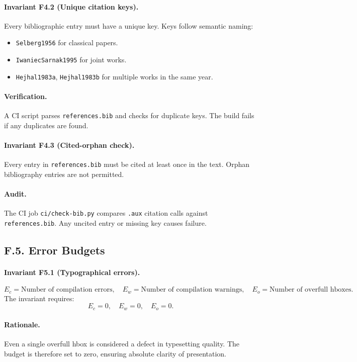 \paragraph{Invariant F4.2 (Unique citation keys).} Every bibliographic entry must have a unique key. Keys follow semantic naming:
\begin{itemize}
    \item \texttt{Selberg1956} for classical papers.
    \item \texttt{IwaniecSarnak1995} for joint works.
    \item \texttt{Hejhal1983a}, \texttt{Hejhal1983b} for multiple works in the same year.
\end{itemize}

\paragraph{Verification.} A CI script parses \texttt{references.bib} and checks for duplicate keys. The build fails if any duplicates are found.

\paragraph{Invariant F4.3 (Cited-orphan check).} Every entry in \texttt{references.bib} must be cited at least once in the text. Orphan bibliography entries are not permitted.

\paragraph{Audit.} The CI job \texttt{ci/check-bib.py} compares \texttt{.aux} citation calls against \texttt{references.bib}. Any uncited entry or missing key causes failure.

\subsection*{F.5. Error Budgets}

\paragraph{Invariant F5.1 (Typographical errors).} 
\[
E_c = \text{Number of compilation errors}, \quad
E_w = \text{Number of compilation warnings}, \quad
E_o = \text{Number of overfull hboxes}.
\]
The invariant requires:
\[
E_c = 0, \quad E_w = 0, \quad E_o = 0.
\]

\paragraph{Rationale.} Even a single overfull hbox is considered a defect in typesetting quality. The budget is therefore set to zero, ensuring absolute clarity of presentation.

